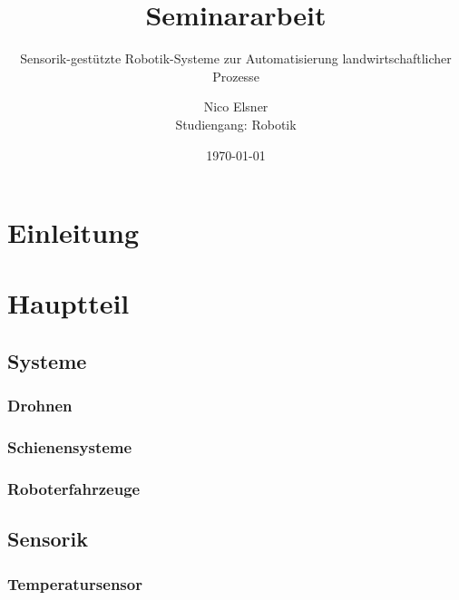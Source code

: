\documentclass[a4paper,
			   11pt,
			   ngerman, 
			   headsepline]{scrreprt}
\begin{document}
	\pagestyle{scrheadings} 

	\title{Seminararbeit}
	\subtitle{Sensorik-gestützte Robotik-Systeme zur Automatisierung landwirtschaftlicher Prozesse}
	\author{Nico Elsner\\
	Studiengang: Robotik}
	\date{\today}
	\maketitle
	\thispagestyle{empty}
	\tableofcontents
	\newpage
	\setcounter{page}{1}
	\chapter{Einleitung}
	
	\chapter{Hauptteil}
	
	
	\section{Systeme}
		\subsection{Drohnen}
		
		\subsection{Schienensysteme}
		
		\subsection{Roboterfahrzeuge}
		

	\section{Sensorik}
	
		\subsection{Temperatursensor}
		
		\cite{oriolplanas2021}
\end{document}
